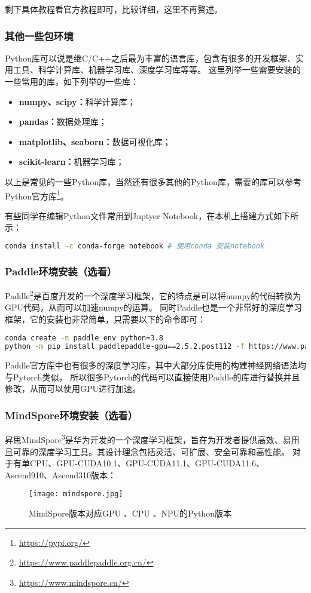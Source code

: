 \documentclass[lang=cn,a4paper,newtx]{elegantpaper}
\begin{document}
剩下具体教程看官方教程即可，比较详细，这里不再赘述。

\subsubsection{其他一些包环境}
Python库可以说是继C/C++之后最为丰富的语言库，包含有很多的开发框架、实用工具、科学计算库、机器学习库、深度学习库等等。
这里列举一些需要安装的一些常用的库，如下列举的一些库：
\begin{itemize}
  \item \textbf{numpy、scipy：}科学计算库；
  \item \textbf{pandas：}数据处理库；
  \item \textbf{matplotlib、seaborn：}数据可视化库；
  \item \textbf{scikit-learn：}机器学习库；
\end{itemize}

以上是常见的一些Python库，当然还有很多其他的Python库，需要的库可以参考Python官方库\footnote{\url{https://pypi.org/}}。

有些同学在编辑Python文件常用到Juptyer Notebook，在本机上搭建方式如下所示：
\begin{lstlisting}[language=bash]
conda install -c conda-forge notebook # 使用conda 安装notebook
\end{lstlisting}

\subsubsection{Paddle环境安装（选看）}
Paddle\footnote{\url{https://www.paddlepaddle.org.cn/}}是百度开发的一个深度学习框架，它的特点是可以将numpy的代码转换为GPU代码，从而可以加速numpy的运算。
同时Paddle也是一个非常好的深度学习框架，它的安装也非常简单，只需要以下的命令即可：
\begin{lstlisting}[language=bash]
conda create -n paddle_env python=3.8
python -m pip install paddlepaddle-gpu==2.5.2.post112 -f https://www.paddlepaddle.org.cn/whl/linux/mkl/avx/stable.html
\end{lstlisting}

Paddle官方库中也有很多的深度学习库，其中大部分库使用的构建神经网络语法均与Pytorch类似，
所以很多Pytorch的代码可以直接使用Paddle的库进行替换并且修改，从而可以使用GPU进行加速。

\subsubsection{MindSpore环境安装（选看）}
昇思MindSpore\footnote{\url{https://www.mindspore.cn/}}是华为开发的一个深度学习框架，旨在为开发者提供高效、易用且可靠的深度学习工具。其设计理念包括灵活、可扩展、安全可靠和高性能。
对于有单CPU、GPU-CUDA10.1、GPU-CUDA11.1、GPU-CUDA11.6、Ascend910、Ascend310版本：
\begin{figure}
  \centering
  \texttt{[image: mindspore.jpg]}
  \caption{MindSpore版本对应GPU 、CPU 、NPU的Python版本}
  \label{fig:mindspore}
\end{figure}
\end{document}
